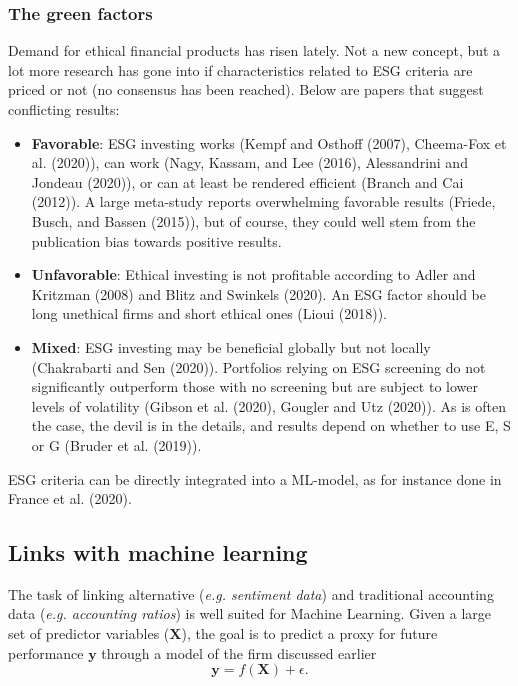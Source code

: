 \subsubsection{The green factors}

Demand for ethical financial products has risen lately. Not a new concept, but a lot more research has gone into if characteristics related to ESG criteria are priced or not (no consensus has been reached). Below are papers that suggest conflicting results:
\begin{itemize}[noitemsep]
    \item \textbf{Favorable}: ESG investing works (Kempf and Osthoff (2007), Cheema-Fox et al. (2020)), can work (Nagy, Kassam, and Lee (2016), Alessandrini and Jondeau (2020)), or can at least be rendered efficient (Branch and Cai (2012)). A large meta-study reports overwhelming favorable results (Friede, Busch, and Bassen (2015)), but of course, they could well stem from the publication bias towards positive results.
    \item \textbf{Unfavorable}: Ethical investing is not profitable according to Adler and Kritzman (2008) and Blitz and Swinkels (2020). An ESG factor should be long unethical firms and short ethical ones (Lioui (2018)).
    \item \textbf{Mixed}: ESG investing may be beneficial globally but not locally (Chakrabarti and Sen (2020)). Portfolios relying on ESG screening do not significantly outperform those with no screening but are subject to lower levels of volatility (Gibson et al. (2020), Gougler and Utz (2020)). As is often the case, the devil is in the details, and results depend on whether to use E, S or G (Bruder et al. (2019)).
\end{itemize}

ESG criteria can be directly integrated into a ML-model, as for instance done in France et al. (2020).

\subsection{Links with machine learning}
The task of linking alternative (\textit{e.g. sentiment data}) and traditional accounting data (\textit{e.g. accounting ratios}) is well suited for Machine Learning. Given a large set of predictor variables ($\mathbf{X}$), the goal is to predict a proxy for future performance $\mathbf{y}$ through a model of the firm discussed earlier
\begin{equation*}
    \mathbf{y} = f(\mathbf{X}) + \epsilon.
\end{equation*}

